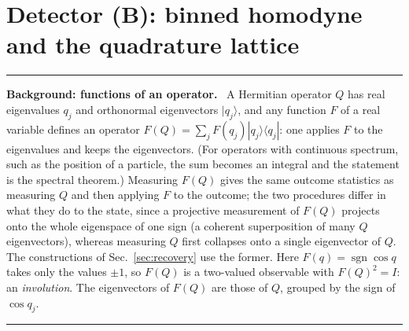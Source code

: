 \documentclass[11pt,a4paper]{article}
\newcommand{\sgn}{\operatorname{sgn}}
\newcommand{\ket}[1]{|#1\rangle}
\newcommand{\bra}[1]{\langle#1|}
\newenvironment{background}[1]{\par\medskip\noindent\hrule\smallskip\noindent\textbf{Background: #1.}\ \ignorespaces}{\par\smallskip\noindent\hrule\medskip}
\begin{document}
\section{Detector (B): binned homodyne and the quadrature lattice}
\label{sec:binned}

\begin{background}{functions of an operator}
A Hermitian operator $Q$ has real eigenvalues $q_j$ and orthonormal eigenvectors $\ket{q_j}$, and any function $F$ of a real variable defines an operator $F(Q)=\sum_jF(q_j)\ket{q_j}\bra{q_j}$: one applies $F$ to the eigenvalues and keeps the eigenvectors. (For operators with continuous spectrum, such as the position of a particle, the sum becomes an integral and the statement is the spectral theorem.) Measuring $F(Q)$ gives the same outcome statistics as measuring $Q$ and then applying $F$ to the outcome; the two procedures differ in what they do to the state, since a projective measurement of $F(Q)$ projects onto the whole eigenspace of one sign (a coherent superposition of many $Q$ eigenvectors), whereas measuring $Q$ first collapses onto a single eigenvector of $Q$. The constructions of Sec.~\ref{sec:recovery} use the former. Here $F(q)=\sgn\cos q$ takes only the values $\pm1$, so $F(Q)$ is a two-valued observable with $F(Q)^2=I$: an \emph{involution}. The eigenvectors of $F(Q)$ are those of $Q$, grouped by the sign of $\cos q_j$.
\end{background}
\end{document}
